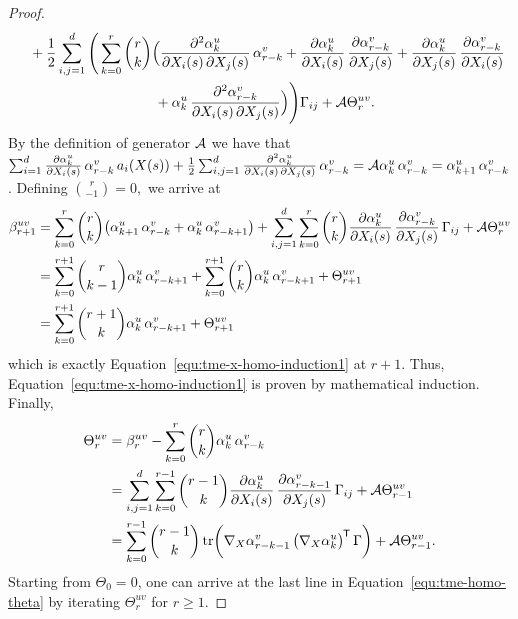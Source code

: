 \begin{proof}
\begin{align*}
		&\quad+ \frac{1}{2}\sum_{i, j=1}^d\Bigg(\sum^r_{k=0}\binom{r}{k}\Big(\frac{\partial^2 \alpha_k^u}{\partial X_i(s) \, \partial X_j(s)} \, \alpha^v_{r-k} + \frac{\partial \alpha_k^u}{\partial X_i(s)} \, \frac{\partial \alpha^v_{r-k}}{\partial X_j(s)} + \frac{\partial \alpha_k^u}{\partial X_j(s)} \, \frac{\partial \alpha^v_{r-k}}{\partial X_i(s)} \\
		&\qquad\qquad\qquad\qquad\qquad  + \alpha^u_k \, \frac{\partial^2 \alpha^v_{r-k}}{\partial X_i(s) \, \partial X_j(s)} \Big)\Bigg)\Gamma_{ij} + \mathcal{A} \Theta^{uv}_r.
	\end{align*}
	By the definition of generator $\mathcal{A}$ we have that $\sum^d_{i=1} \frac{\partial \alpha^u_k}{\partial X_i(s)} \, \alpha^v_{r-k} \, a_i(X(s)) + \frac{1}{2} \sum^d_{i,j=1} \frac{\partial^2 \alpha_k^u}{\partial X_i(s) \, \partial X_j(s)} \, \alpha^v_{r-k} = \mathcal{A} \alpha^u_k \, \alpha^v_{r-k} = \allowbreak \alpha^u_{k+1} \, \alpha^v_{r-k}$. Defining $\binom{r}{-1} = 0,$ we arrive at
	\begin{align*}
		\beta^{uv}_{r+1} &= \sum^r_{k=0} \binom{r}{k} \big(\alpha^u_{k+1} \, \alpha^v_{r-k} + \alpha^u_{k} \, \alpha^v_{r-k+1}\big) + \sum_{i, j=1}^d \sum^r_{k=0} \binom{r}{k}\frac{\partial \alpha_k^u}{\partial X_i(s)} \, \frac{\partial \alpha^v_{r-k}}{\partial X_j(s)} \,\Gamma_{ij} + \mathcal{A} \Theta^{uv}_r\\
		&= \sum^{r+1}_{k=0} \binom{r}{k-1}\alpha^u_k \, \alpha^v_{r-k+1} + \sum^{r+1}_{k=0}\binom{r}{k}\alpha^u_{k} \, \alpha^v_{r-k+1} + \Theta^{uv}_{r+1} \\
		&= \sum^{r+1}_{k=0} \binom{r+1}{k} \alpha^u_{k} \, \alpha^v_{r-k+1} + \Theta^{uv}_{r+1}
	\end{align*}
	which is exactly Equation~\eqref{equ:tme-x-homo-induction1} at $r+1$. Thus, Equation~\eqref{equ:tme-x-homo-induction1} is proven by mathematical induction. Finally, 
	\begin{equation}
		\begin{split}
			\Theta^{uv}_{r} &= \beta^{uv}_r - \sum^r_{k=0}\binom{r}{k} \alpha^u_k \, \alpha^v_{r-k} \\
			&= \sum^d_{i,j=1} \sum^{r-1}_{k=0} \binom{r-1}{k} \frac{\partial \alpha^u_k}{\partial X_i(s)} \, \frac{\partial \alpha^v_{r-k-1}}{\partial X_j(s)} \, \Gamma_{ij} + \mathcal{A} \Theta_{r-1}^{uv} \\
			&= \sum^{r-1}_{k=0} \binom{r-1}{k} \operatorname{tr} \biggl( \nabla_X \alpha^v_{r-k-1} \, \big(\nabla_X \alpha^u_k\big)^{\mkern-1.5mu\mathsf{T}} \, \Gamma \biggr) + \mathcal{A} \Theta_{r-1}^{uv}.
			\nonumber
		\end{split}
	\end{equation}
	Starting from $\Theta_0 = 0$, one can arrive at the last line in Equation~\eqref{equ:tme-homo-theta} by iterating $\Theta^{uv}_r$ for $r\geq 1$.
\end{proof}

